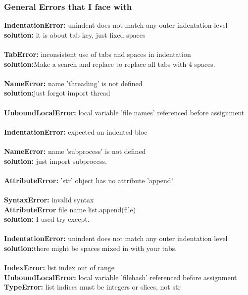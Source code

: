\documentclass[onecolumn]{article}
\begin{document}
\subsubsection{General Errors that I face with}

\textbf{IndentationError:} unindent does not match any outer indentation level \\   
\textbf{solution:} it is about tab key, just fixed spaces \\ \\
\textbf{TabError: }inconsistent use of tabs and spaces in indentation  \\
\textbf{solution:}Make a search and replace to replace all tabs with 4 spaces. \\ \\
\textbf{NameError:} name 'threading' is not defined \\
\textbf{solution:}just forgot import thread  \\ \\
\textbf{UnboundLocalError: }local variable 'file names' referenced before assignment \\ \\
\textbf{IndentationError:} expected an indented bloc \\\\
\textbf{NameError: }name 'subprocess' is not defined \\
\textbf{solution:} just import subprocess. \\ \\
\textbf{AttributeError:} 'str' object has no attribute 'append' \\ \\
\textbf{SyntaxError:} invalid syntax \\ 
 \textbf{AttributeError}  file name list.append(file) \\ 
 \textbf{solution:} I used try-except. \\ \\
 \textbf{IndentationError:} unindent does not match any outer indentation level
 \textbf{solution:}there might be spaces mixed in with your tabs. \\ \\ 
\textbf{ IndexError:} list index out of range \\ 
\textbf{UnboundLocalError:} local variable 'filehash' referenced before assignment \\ 
\textbf{TypeError: }list indices must be integers or slices, not str\\
\end{document}
